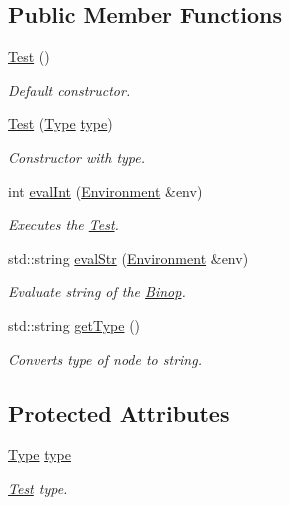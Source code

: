 \subsection*{Public Member Functions}
\begin{DoxyCompactItemize}
\item 
\hypertarget{classTest_a99f2bbfac6c95612322b0f10e607ebe5}{}\hyperlink{classTest_a99f2bbfac6c95612322b0f10e607ebe5}{Test} ()\label{classTest_a99f2bbfac6c95612322b0f10e607ebe5}

\begin{DoxyCompactList}\small\item\em Default constructor. \end{DoxyCompactList}\item 
\hyperlink{classTest_aefafe8c714d1bbd89f09daf43793b465}{Test} (\hyperlink{classTest_a9e5d00cf02fb05573a6f97d14ebc154a}{Type} \hyperlink{classTest_add1faa7d527f515b973350d566772265}{type})
\begin{DoxyCompactList}\small\item\em Constructor with type. \end{DoxyCompactList}\item 
int \hyperlink{classTest_a4366c4ade4ae8732660604f344ea9567}{eval\+Int} (\hyperlink{classEnvironment}{Environment} \&env)
\begin{DoxyCompactList}\small\item\em Executes the \hyperlink{classTest}{Test}. \end{DoxyCompactList}\item 
std\+::string \hyperlink{classTest_a48f01bd6e66144e9adccda3a090552b3}{eval\+Str} (\hyperlink{classEnvironment}{Environment} \&env)
\begin{DoxyCompactList}\small\item\em Evaluate string of the \hyperlink{classBinop}{Binop}. \end{DoxyCompactList}\item 
std\+::string \hyperlink{classTest_adeefe4160992fad5d3a52584f69a420d}{get\+Type} ()
\begin{DoxyCompactList}\small\item\em Converts type of node to string. \end{DoxyCompactList}\end{DoxyCompactItemize}
\subsection*{Protected Attributes}
\begin{DoxyCompactItemize}
\item 
\hypertarget{classTest_add1faa7d527f515b973350d566772265}{}\hyperlink{classTest_a9e5d00cf02fb05573a6f97d14ebc154a}{Type} \hyperlink{classTest_add1faa7d527f515b973350d566772265}{type}\label{classTest_add1faa7d527f515b973350d566772265}

\begin{DoxyCompactList}\small\item\em \hyperlink{classTest}{Test} type. \end{DoxyCompactList}\end{DoxyCompactItemize}


